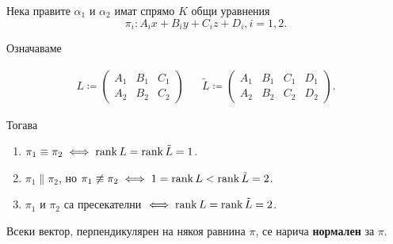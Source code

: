 \documentclass{../../common/topic}
\begin{document}
\begin{theorem}
  Нека правите \( \alpha_1 \) и \( \alpha_2 \) имат спрямо \( K \) общи уравнения
  \begin{equation}
    \pi_i : A_i x + B_i y + C_i z + D_i, i = 1, 2.
  \end{equation}

  Означаваме

  \begin{align*}
    L \coloneqq \begin{pmatrix}
      A_1 & B_1 & C_1 \\
      A_2 & B_2 & C_2
    \end{pmatrix}
    &&
    \tilde L \coloneqq \begin{pmatrix}
      A_1 & B_1 & C_1 & D_1 \\
      A_2 & B_2 & C_2 & D_2
    \end{pmatrix}.
  \end{align*}

  Тогава
  \begin{enumerate}
    \item \( \pi_1 \equiv \pi_2 \iff \operatorname{rank} L = \operatorname{rank} \tilde L = 1 \).
    \item \( \pi_1 \parallel \pi_2 \), но \( \pi_1 \not\equiv \pi_2 \iff 1 = \operatorname{rank} L < \operatorname{rank} \tilde L = 2 \).
    \item \( \pi_1 \) и \( \pi_2 \) са пресекателни \( \iff \operatorname{rank} L = \operatorname{rank} \tilde L = 2 \).
  \end{enumerate}
\end{theorem}

\begin{definition}
  Всеки вектор, перпендикулярен на някоя равнина \( \pi \), се нарича \textbf{нормален} за \( \pi \).
\end{definition}
\end{document}
